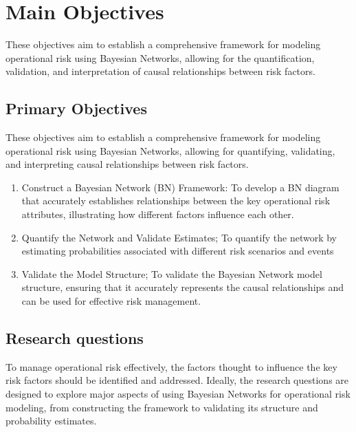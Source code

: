 \section{Main Objectives}
These objectives aim to establish a comprehensive framework for modeling operational risk using Bayesian Networks, allowing for the quantification, validation, and interpretation of causal relationships between risk factors.
 \subsection{Primary Objectives}
These objectives aim to establish a comprehensive framework for modeling operational risk using Bayesian Networks, allowing for quantifying, validating, and interpreting causal relationships between risk factors.
\begin{enumerate}
    \item Construct a Bayesian Network (BN) Framework: To develop a BN diagram that accurately establishes relationships between the key operational risk attributes, illustrating how different factors influence each other.
    \item Quantify the Network and Validate Estimates; To quantify the network by estimating probabilities associated with different risk scenarios and events
    \item Validate the Model Structure; To validate the Bayesian Network model structure, ensuring that it accurately represents the causal relationships and can be used for effective risk management.
\end{enumerate}

\subsection{Research questions}
To manage operational risk effectively, the factors thought to influence the key risk factors should be identified and addressed. Ideally, the research questions are designed to explore major aspects of using Bayesian Networks for operational risk modeling, from constructing the framework to validating its structure and probability estimates. 

